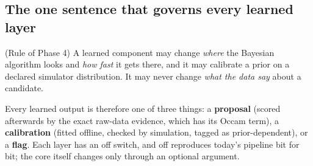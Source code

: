 \subsection{The one sentence that governs every learned layer}
\begin{theorem}{(Rule of Phase 4) \impl}\label{thm:phase4}
A learned component may change \emph{where} the Bayesian algorithm looks and \emph{how fast} it gets there, and it may calibrate a prior on a declared simulator distribution. It may never change \emph{what the data say} about a candidate.
\end{theorem}
Every learned output is therefore one of three things: a \textbf{proposal} (scored afterwards by the exact raw-data evidence, which has its Occam term), a \textbf{calibration} (fitted offline, checked by simulation, tagged as prior-dependent), or a \textbf{flag}. Each layer has an off switch, and off reproduces today's pipeline bit for bit; the core itself changes only through an optional argument.

